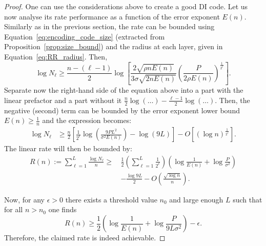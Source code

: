 \documentclass[10pt,a4paper]{amsart}
\begin{document}
\begin{proof}
One can use the considerations above to create a good DI code. Let us now analyse its rate performance as a function of the error exponent $E(n)$. Similarly as in the previous section, the rate can be bounded using Equation~\eqref{eq:encoding_code_size} (extracted from Proposition~\ref{prop:size_bound}) and the radius at each layer, given in Equation~\eqref{eq:RR_radius}. Then,
\begin{equation}
\log N_\ell\geq\frac{n-(\ell-1)}{2}\log\left[\frac{2\sqrt{\rho n E(n)}}{3\sigma\sqrt{2nE(n)}}\left(\frac{P}{2\rho E(n)}\right)^\frac{1}{2^\ell}\right].
\end{equation}
Separate now the right-hand side of the equation above into a part with the linear prefactor and a part without it $\frac{n}{2}\log(\dots)-\frac{\ell-1}{2}\log(\dots)$. Then, the negative (second) term can be bounded by the error exponent lower bound $E(n)\geq\frac1n$ and the expression becomes:
\begin{equation}
\begin{split}
\log N_\ell&\geq\!\frac{n}{2}\left[\frac{1}{2^\ell}\log\left(\frac{9PL^2}{\sigma^2 E(n)}\right)\!-\!\log\left(9L\right)\right]\!-\!O\left[(\log n)^\frac{1}{2^\ell}\right]\!.
\end{split}
\end{equation}
The linear rate will then be bounded by:
\begin{align}
R(n):=\sum_{\ell=1}^L\frac{\log N_\ell}{n}\geq\, &\frac12\left(\sum_{\ell=1}^L\frac{1}{2^\ell}\right)\!\!\left(\log\frac{1}{E(n)}+\log\frac{P}{\sigma^2}\right)\nonumber\\
&-\frac{\log 9L}{2}-O\left(\frac{\sqrt{\log n}}{n}\right).\label{eq:RR_rate}
\end{align}

Now, for any $\epsilon>0$ there exists a threshold value $n_0$ and large enough $L$ such that for all $n>n_0$ one finds 
\begin{equation}
R(n)\geq\frac12 \left(\log\frac{1}{E(n)}+\log\frac{P}{9L\sigma^2} \right)-\epsilon.
\end{equation}
Therefore, the claimed rate is indeed achievable.
\end{proof}
\end{document}
